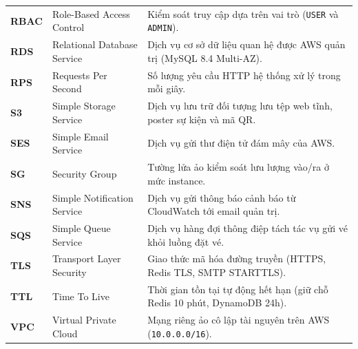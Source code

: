 {\begin{longtable}{>{\bfseries}p{1.8cm} >{\raggedright\arraybackslash}p{5.2cm} >{\raggedright\arraybackslash}p{7.6cm}}
  RBAC & Role-Based Access Control & Kiểm soát truy cập dựa trên vai trò (\texttt{USER} và \texttt{ADMIN}). \\
  RDS & Relational Database Service & Dịch vụ cơ sở dữ liệu quan hệ được AWS quản trị (MySQL 8.4 Multi-AZ). \\
  RPS & Requests Per Second & Số lượng yêu cầu HTTP hệ thống xử lý trong mỗi giây. \\
  S3 & Simple Storage Service & Dịch vụ lưu trữ đối tượng lưu tệp web tĩnh, poster sự kiện và mã QR. \\
  SES & Simple Email Service & Dịch vụ gửi thư điện tử đám mây của AWS. \\
  SG & Security Group & Tường lửa ảo kiểm soát lưu lượng vào/ra ở mức instance. \\
  SNS & Simple Notification Service & Dịch vụ gửi thông báo cảnh báo từ CloudWatch tới email quản trị. \\
  SQS & Simple Queue Service & Dịch vụ hàng đợi thông điệp tách tác vụ gửi vé khỏi luồng đặt vé. \\
  TLS & Transport Layer Security & Giao thức mã hóa đường truyền (HTTPS, Redis TLS, SMTP STARTTLS). \\
  TTL & Time To Live & Thời gian tồn tại tự động hết hạn (giữ chỗ Redis 10 phút, DynamoDB 24h). \\
  VPC & Virtual Private Cloud & Mạng riêng ảo cô lập tài nguyên trên AWS (\texttt{10.0.0.0/16}). \\
\end{longtable}
}

\clearpage
